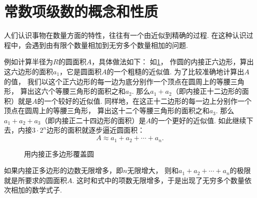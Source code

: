\section{常数项级数的概念和性质}
人们认识事物在数量方面的特性，往往有一个由近似到精确的过程.
在这种认识过程中，会遇到由有限个数量相加到无穷多个数量相加的问题.

例如计算半径为\(R\)的圆面积\(A\)，具体做法如下：
如\cref{figure:无穷级数.用内接正多边形覆盖圆}，
作圆的内接正六边形，算出这六边形的面积\(a_1\)，它是圆面积\(A\)的一个粗糙的近似值.
为了比较准确地计算出\(A\)的值，
我们以这个正六边形的每一边为底分别作一个顶点在圆周上的等腰三角形，
算出这六个等腰三角形的面积之和\(a_2\).
那么\(a_1+a_2\)（即内接正十二边形的面积）就是\(A\)的一个较好的近似值.
同样地，在这正十二边形的每一边上分别作一个顶点在圆周上的等腰三角形，
算出这十二个等腰三角形的面积之和\(a_3\).
那么\(a_1+a_2+a_3\)（即内接正二十四边形的面积）是\(A\)的一个更好的近似值.
如此继续下去，内接\(3\cdot2^n\)边形的面积就逐步逼近圆面积：\[
	A \approx a_1 + a_2 + \dotsb + a_n.
\]

\begin{figure}[h]
	\centering
	\caption{用内接正多边形覆盖圆}
	\label{figure:无穷级数.用内接正多边形覆盖圆}
\end{figure}

如果内接正多边形的边数无限增多，即\(n\)无限增大，
则和\(a_1+a_2+\dotsb+a_n\)的极限就是所要求的圆面积\(A\).
这时和式中的项数无限增多，于是出现了无穷多个数量依次相加的数学式子.

